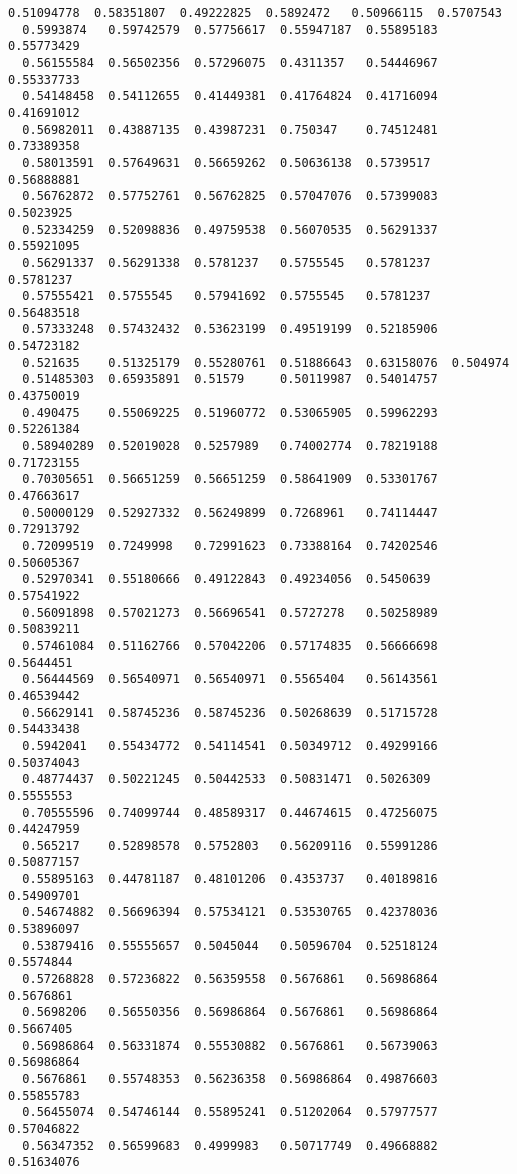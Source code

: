 \documentclass[11pt]{article}
\begin{document}
\begin{Verbatim}[commandchars=\\\{\}]
  0.51094778  0.58351807  0.49222825  0.5892472   0.50966115  0.5707543
  0.5993874   0.59742579  0.57756617  0.55947187  0.55895183  0.55773429
  0.56155584  0.56502356  0.57296075  0.4311357   0.54446967  0.55337733
  0.54148458  0.54112655  0.41449381  0.41764824  0.41716094  0.41691012
  0.56982011  0.43887135  0.43987231  0.750347    0.74512481  0.73389358
  0.58013591  0.57649631  0.56659262  0.50636138  0.5739517   0.56888881
  0.56762872  0.57752761  0.56762825  0.57047076  0.57399083  0.5023925
  0.52334259  0.52098836  0.49759538  0.56070535  0.56291337  0.55921095
  0.56291337  0.56291338  0.5781237   0.5755545   0.5781237   0.5781237
  0.57555421  0.5755545   0.57941692  0.5755545   0.5781237   0.56483518
  0.57333248  0.57432432  0.53623199  0.49519199  0.52185906  0.54723182
  0.521635    0.51325179  0.55280761  0.51886643  0.63158076  0.504974
  0.51485303  0.65935891  0.51579     0.50119987  0.54014757  0.43750019
  0.490475    0.55069225  0.51960772  0.53065905  0.59962293  0.52261384
  0.58940289  0.52019028  0.5257989   0.74002774  0.78219188  0.71723155
  0.70305651  0.56651259  0.56651259  0.58641909  0.53301767  0.47663617
  0.50000129  0.52927332  0.56249899  0.7268961   0.74114447  0.72913792
  0.72099519  0.7249998   0.72991623  0.73388164  0.74202546  0.50605367
  0.52970341  0.55180666  0.49122843  0.49234056  0.5450639   0.57541922
  0.56091898  0.57021273  0.56696541  0.5727278   0.50258989  0.50839211
  0.57461084  0.51162766  0.57042206  0.57174835  0.56666698  0.5644451
  0.56444569  0.56540971  0.56540971  0.5565404   0.56143561  0.46539442
  0.56629141  0.58745236  0.58745236  0.50268639  0.51715728  0.54433438
  0.5942041   0.55434772  0.54114541  0.50349712  0.49299166  0.50374043
  0.48774437  0.50221245  0.50442533  0.50831471  0.5026309   0.5555553
  0.70555596  0.74099744  0.48589317  0.44674615  0.47256075  0.44247959
  0.565217    0.52898578  0.5752803   0.56209116  0.55991286  0.50877157
  0.55895163  0.44781187  0.48101206  0.4353737   0.40189816  0.54909701
  0.54674882  0.56696394  0.57534121  0.53530765  0.42378036  0.53896097
  0.53879416  0.55555657  0.5045044   0.50596704  0.52518124  0.5574844
  0.57268828  0.57236822  0.56359558  0.5676861   0.56986864  0.5676861
  0.5698206   0.56550356  0.56986864  0.5676861   0.56986864  0.5667405
  0.56986864  0.56331874  0.55530882  0.5676861   0.56739063  0.56986864
  0.5676861   0.55748353  0.56236358  0.56986864  0.49876603  0.55855783
  0.56455074  0.54746144  0.55895241  0.51202064  0.57977577  0.57046822
  0.56347352  0.56599683  0.4999983   0.50717749  0.49668882  0.51634076

\end{Verbatim}
\end{document}
